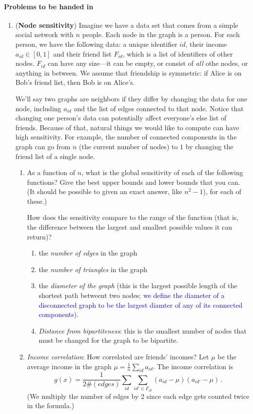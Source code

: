\documentclass[11pt]{article}
\begin{document}
 \paragraph{Problems to be handed in}
\begin{enumerate}[leftmargin=\parindent, itemsep=3ex]

  
\item (\textbf{Node sensitivity}) Imagine we have a data set
  that comes from a simple social network with $n$ people. Each node in the graph is a
  person. For each person, we have the following data: a unique
  identifier $id$, their income $a_{id} \in [0,1]$
  and their friend list $F_{id}$, which is a list of identifiers
  of other nodes. $F_{id}$ can have any size---it can be empty, or
  consist of \emph{all} othe nodes, or anything in between. We
  assume that friendship is symmetric: if Alice is on Bob's friend
  list, then Bob is on Alice's.

  We'll say two graphs are neighbors if they differ by changing the
  data for one node, including $a_{id}$ and the list of edges connected
  to that node. Notice that changing one person's data can potentially
  affect everyone's else list of friends.
  Because of that, natural things
  we would like to compute can have high sensitivity. For example, the
  number of connected components in the graph can go from $n$ (the
  current number of nodes) to $1$
  by changing the friend list of  a single node. 
  
  \begin{enumerate}
  \item As a function of $n$, what is the global sensitivity of each
    of the following functions? Give the best upper bounds and lower
    bounds that you can. (It should be possible to given an exact
    answer, like $n^2-1$), for each of these.)

    How does the sensitivity compare to the range of the function
    (that is, the difference between the largest and smallest possible
    values it can return)?
    \begin{enumerate}
    \item the \emph{number of edges} in the graph
    \item the \emph{number of triangles} in the graph
    \item the \emph{diameter of the graph} (this is the largest
      possible length of the shortest path betweent two nodes; \textcolor{blue}{we define the diameter of a disconnected graph to
      be the largest diamter of any of its connected components}). 
    \item \emph{Distance from bipartiteness}: this is the smallest
      number of nodes that must be changed for the graph to be
      bipartite.
    \end{enumerate}
  \item \emph{Income correlation}: How correlated are friends'
    incomes? Let $\mu$ be the average income in the graph 
    $\mu = \frac 1 n \sum_{id} a_{id}$. The income correlation is
    $$g(x) =  \frac 1{2\# (edges)} \sum_{id} \sum_{id' \in F_{id}}
    (a_{id}-\mu)(a_{id'}-\mu)\, .$$
    (We multiply the number of edges by 2 since each edge gets
    counted twice in the formula.)
    

\end{enumerate}
\end{enumerate}
\end{document}

